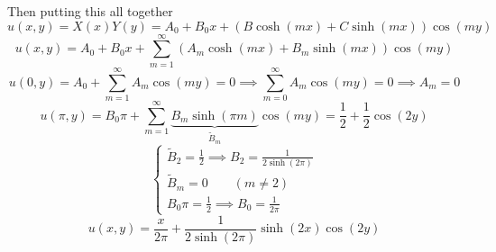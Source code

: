 \documentclass[12pt]{article}
\begin{document}
Then putting this all together
\[u(x, y) = X(x)Y(y) = A_0 + B_0x + (B\cosh(mx) + C\sinh(mx) )\cos(my)\]
\[u(x, y) =  A_0 + B_0x + \sum_{m=1}^\infty(A_m\cosh(mx) + B_m\sinh(mx) )\cos(my)\]
\[u(0, y) = A_0 + \sum_{m=1}^\infty A_m\cos(my) = 0 \implies \sum_{m=0}^\infty A_m\cos(my) = 0 \implies A_m = 0\]
\[u(\pi, y) = B_0\pi + \sum_{m=1}^\infty \underbrace{B_m\sinh(\pi m)}_{\tilde{B}_m}\cos(my) = \frac{1}{2} + \frac{1}{2}\cos(2y)\]
\[\begin{cases}
    \tilde{B}_2 = \frac{1}{2} \implies B_2 = \frac{1}{2\sinh(2\pi)}\\
    \tilde{B}_m = 0 \qquad (m \neq 2)\\
    B_0\pi = \frac{1}{2} \implies B_0 = \frac{1}{2\pi}
\end{cases}\]
\[\boxed{u(x, y) = \frac{x}{2\pi} + \frac{1}{2\sinh(2\pi)}\sinh(2x)\cos(2y)}\]
\color{black}
\pagebreak
\end{document}
